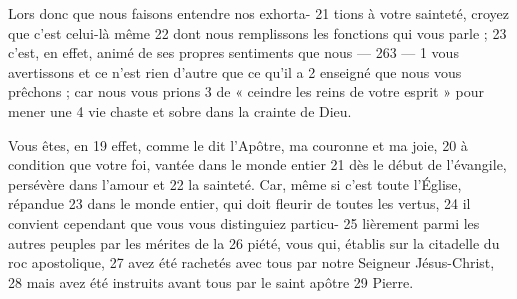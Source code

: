 Lors donc que nous faisons entendre nos exhorta-	 
21	 	tions à votre sainteté, croyez que c'est celui-là même	 
22	 	dont nous remplissons les fonctions qui vous parle ;	 
23	 	c'est, en effet, animé de ses propres sentiments que nous	 
 	--- 263 ---	 
1	 	vous avertissons et ce n'est rien d'autre que ce qu'il a	 
2	 	enseigné que nous vous prêchons ; car nous vous prions	 
3	 	de « ceindre les reins de votre esprit » pour mener une	 
4	 	vie chaste et sobre dans la crainte de Dieu.

Vous êtes, en	 
19	 	effet, comme le dit l'Apôtre, ma couronne et ma joie,	 
20	 	à condition que votre foi, vantée dans le monde entier	 
21	 	dès le début de l'évangile, persévère dans l'amour et	 
22	 	la sainteté. Car, même si c'est toute l'Église, répandue	 
23	 	dans le monde entier, qui doit fleurir de toutes les vertus,	 
24	 	il convient cependant que vous vous distinguiez particu-	 
25	 	lièrement parmi les autres peuples par les mérites de la	 
26	 	piété, vous qui, établis sur la citadelle du roc apostolique,	 
27	 	avez été rachetés avec tous par notre Seigneur Jésus-Christ,	 
28	 	mais avez été instruits avant tous par le saint apôtre	 
29	 	Pierre.